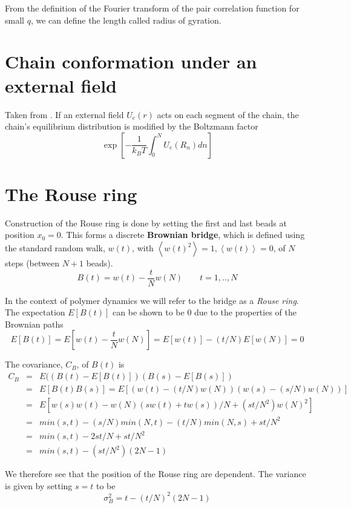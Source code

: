 \documentclass{report}
\begin{document}
From the definition of the Fourier transform of the pair correlation function for small $q$, we can define the length called radius of gyration. 

\section{Chain conformation under an external field}
Taken from \cite{doi1986theory}. If an external field $U_e(r)$ acts on each segment of the chain, the chain's equilibrium distribution is modified by the Boltzmann factor 
\begin{equation*}
\exp\left[ -\frac{1}{k_BT}\int_0^N U_e(R_n)dn\right]
\end{equation*}


\section{The Rouse ring}\label{section_theRouseRing}
Construction of the Rouse ring is done by setting the first and last beads at position $x_0=0$. This forms a discrete \textbf{Brownian bridge}, which is defined using the standard random walk, $w(t)$, with $\left<w(t)^2\right>=1, \left<w(t)\right>=0$, of $N$ steps (between $N+1$ beads). 
\begin{equation*}
B(t)= w(t)-\frac{t}{N}w(N) \qquad t=1,..,N
\end{equation*} 

In the context of polymer dynamics we will refer to the bridge as a \textit{Rouse ring}. The expectation $E[B(t)]$ can be shown to be 0 due to the properties of the Brownian paths
\begin{equation*}
E[B(t)]=E[w(t)-\frac{t}{N}w(N)]=E[w(t)] -(t/N)E[w(N)]=0
\end{equation*}

The covariance, $C_B$, of $B(t)$ is 
\begin{eqnarray*}
C_{B}  & = & E((B(t)-E[B(t)])(B(s)-E[B(s)])\\
   & = & E[B(t)B(s)]=E[(w(t)-(t/N)w(N))(w(s)-(s/N)w(N))]\\
   & = & E[w(s)w(t)-w(N)(sw(t)+tw(s))/N +(st/N^2)w(N)^2 ]\\
   & = & min(s,t)-(s/N)min(N,t)-(t/N)min(N,s)+st/N^2\\
   & = & min(s,t)-2st/N+st/N^2\\
   & = & min(s,t)-(st/N^2)(2N-1)
\end{eqnarray*}

We therefore see that the position of the Rouse ring are dependent. The variance is given by setting $s=t$ to be 
\begin{equation*}  
\sigma^2_{B}=t-(t/N)^2(2N-1)
\end{equation*}
\end{document}
